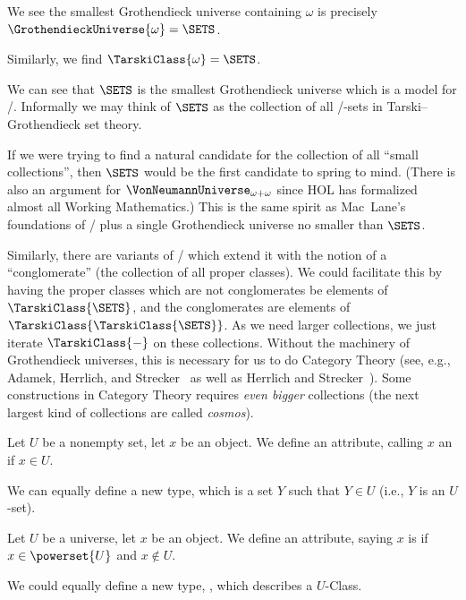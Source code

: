 \begin{theorem}
We see the smallest Grothendieck universe containing $\omega$ is
precisely $\GrothendieckUniverse{\omega} = \SETS$.

Similarly, we find $\TarskiClass{\omega} = \SETS$.
\end{theorem}

\begin{remark}
We can see that $\SETS$ is the smallest Grothendieck universe which is a
model for \ZFC/. Informally we may think of $\SETS$ as the collection
of all \ZF/-sets in Tarski--Grothendieck set theory.

If we were trying to find a natural candidate for the collection of
all ``small collections'', then $\SETS$ would be the first candidate
to spring to mind. (There is also an argument for
$\VonNeumannUniverse_{\omega+\omega}$ since HOL has formalized almost
all Working Mathematics.) This is the same spirit as Mac~Lane's
foundations of \ZFpmC/ plus a single Grothendieck universe no smaller
than $\SETS$.

Similarly, there are variants of \MK/ which extend it with the notion
of a ``conglomerate'' (the collection of all proper classes). We could
facilitate this by having the proper classes which are not
conglomerates be elements of $\TarskiClass{\SETS}$, and the
conglomerates are elements of $\TarskiClass{\TarskiClass{\SETS}}$. As
we need larger collections, we just iterate $\TarskiClass{-}$ on these
collections. Without the machinery of Grothendieck universes, this is
necessary for us to do Category Theory (see, e.g., Adamek, Herrlich, and Strecker~\cite{adamek1990abstract}
as well as Herrlich and Strecker~\cite{horst2007category}). Some
constructions in Category Theory requires \emph{even bigger}
collections (the next largest kind of collections are called
\emph{cosmos}). 
\end{remark}

\begin{definition}[$U$-sets]
Let $U$ be a nonempty set, let $x$ be an object. We define an
attribute, calling $x$ an  if $x\in U$.

We can equally define a new type,  which is a set $Y$
such that $Y\in U$ (i.e., $Y$ is an $U$-set).
\end{definition}

\begin{definition}[$U$-classes]
Let $U$ be a universe, let $x$ be an object. We define an attribute,
saying $x$ is  if $x\in\powerset{U}$ and $x\notin U$.

We could equally define a new type, , which
describes a $U$-Class.
\end{definition}

